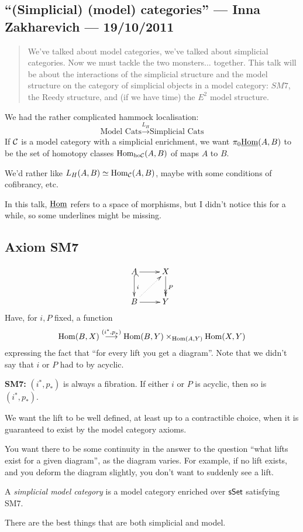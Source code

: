 \documentclass[11pt]{article}
\newcommand{\KanSemResponse}[1]
{
\thispagestyle{fancy}
\subsection*{#1}
}
\begin{document}
\begin{InnaSimplicalModelCats}
\KanSemResponse
{``(Simplicial) (model) categories'' --- Inna Zakharevich --- 19/10/2011}
\begin{abstract}
We've talked about model categories, we've talked about simplicial categories. Now we must tackle the two monsters... together. This talk will be about the interactions of the simplicial structure and the model structure on the category of simplicial objects in a model category: $SM7$, the Reedy structure, and (if we have time) the $E^2$ model structure.
\end{abstract}
We had the rather complicated hammock localisation:
\[\text{Model Cats}\overset{L_H}{\to}\text{Simplicial Cats}\]
If $\mathcal{C}$ is a model category with a simplicial enrichment, we want $\pi_0\underline{\operatorname{Hom}}(A,B)$ to be the set of homotopy classes $\operatorname{Hom}_{\textup{ho}\mathcal{C}}(A,B)$ of maps $A$ to $B$.

We'd rather like $L_H(A,B)\simeq \operatorname{Hom}_{\mathcal{C}}(A,B)$, maybe with some conditions of cofibrancy, etc.

In this talk, $\underline{\operatorname{Hom}}$ refers to a space of morphisms, but I didn't notice this for a while, so some underlines might be missing.
\subsection*{Axiom SM7}
\[\xymatrix{
A\ar[r]\ar@{^{(}->}[d]^i&X\ar@{->>}[d]^P\\
B\ar[r]\ar@{..>}[ur]&Y
}\]
Have, for $i,P$ fixed, a function 
 \[\operatorname{Hom}(B,X)\overset{(i^*,p_*)}{\longrightarrow}\operatorname{Hom}(B,Y)\times_{\operatorname{Hom}(A,Y)}\operatorname{Hom}(X,Y)\]
expressing the fact that ``for every lift you get a diagram''. Note that
we didn't say that $i$ or $P$ had to by acyclic.

\noindent \textbf{\Bullet SM7:} $(i^*,p_*)$ is always a fibration. If either $i$ or $P$ is acyclic, then so is $(i^*,p_*)$.
\begin{itemise}
\item We want the lift to be well defined, at least up to a contractible choice, when it is guaranteed to exist by the model category axioms.
\item You want there to be some continuity in the answer to the question ``what lifts exist for a given diagram'', as the diagram varies. For example, if no lift exists, and you deform the diagram slightly, you don't want to suddenly see a lift.
\end{itemise}
\begin{defn*}
A \emph{simplicial model category} is a model category enriched over $\operatorname{{\mathsf{sSet}}}$ satisfying SM7.
\end{defn*}
\noindent There are the best things that are both simplicial and model.

\end{InnaSimplicalModelCats}
\end{document}
